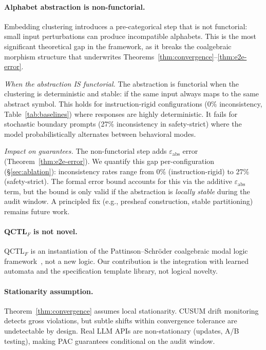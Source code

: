 \documentclass[11pt]{article}
\newcommand{\qctlf}{QCTL$_F$}
\begin{document}
\paragraph{Alphabet abstraction is non-functorial.}
Embedding clustering introduces a pre-categorical step that is not
functorial: small input perturbations can produce incompatible alphabets.
This is the most significant theoretical gap in the framework,
as it breaks the coalgebraic morphism structure that underwrites
Theorems~\ref{thm:convergence}--\ref{thm:e2e-error}.

\emph{When the abstraction IS functorial.}
The abstraction is functorial when the clustering is deterministic
and stable: if the same input always maps to the same abstract symbol.
This holds for instruction-rigid configurations (0\% inconsistency,
Table~\ref{tab:baselines}) where responses are highly deterministic.
It fails for stochastic boundary prompts (27\% inconsistency in
safety-strict) where the model probabilistically alternates between
behavioral modes.

\emph{Impact on guarantees.}
The non-functorial step adds $\varepsilon_{\mathrm{abs}}$ error
(Theorem~\ref{thm:e2e-error}).  We quantify this gap per-configuration
(\S\ref{sec:ablation}): inconsistency rates range from 0\%
(instruction-rigid) to 27\% (safety-strict).  The formal error
bound accounts for this via the additive
$\varepsilon_{\mathrm{abs}}$ term, but the bound is only valid
if the abstraction is \emph{locally stable} during the audit window.
A principled fix (e.g., presheaf construction, stable partitioning)
remains future work.

\paragraph{QCTL$_F$ is not novel.}
\qctlf{} is an instantiation of the Pattinson--Schr\"oder coalgebraic
modal logic framework~\cite{pattinson2008coalgebraic}, not a new
logic.  Our contribution is the integration with learned automata
and the specification template library, not logical novelty.

\paragraph{Stationarity assumption.}
Theorem~\ref{thm:convergence} assumes local stationarity.  CUSUM
drift monitoring detects gross violations, but subtle shifts within
convergence tolerance are undetectable by design.  Real LLM APIs
are non-stationary (updates, A/B testing), making PAC guarantees
conditional on the audit window.
\end{document}
